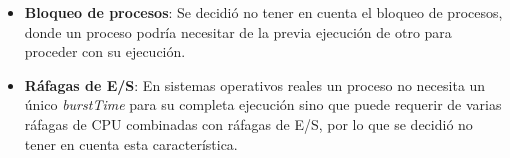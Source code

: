 \begin{enumerate}
    \begin{itemize}
        \item \textbf{Bloqueo de procesos}: Se decidió no tener en cuenta el bloqueo de procesos, donde un proceso podría necesitar de la previa ejecución de otro para proceder con su ejecución.
        \item \textbf{Ráfagas de E/S}: En sistemas operativos reales un proceso no necesita un único \textit   {burstTime} para su completa ejecución sino que puede requerir de varias ráfagas de CPU combinadas con ráfagas de E/S, por lo que se decidió no tener en cuenta esta característica.
    \end{itemize}
\end{enumerate}















